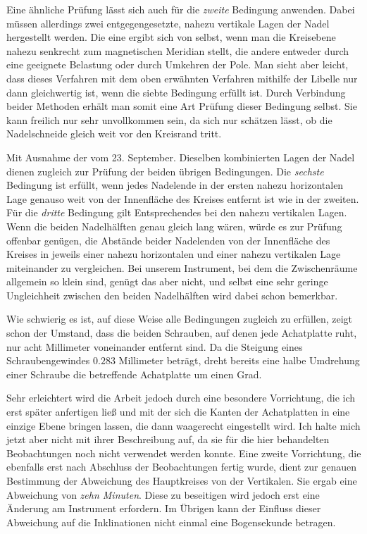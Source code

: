 Eine ähnliche Prüfung lässt sich auch für die \textit{zweite} Bedingung anwenden. Dabei müssen allerdings zwei entgegengesetzte, nahezu vertikale Lagen der Nadel hergestellt werden. Die eine ergibt sich von selbst, wenn man die Kreisebene nahezu senkrecht zum magnetischen Meridian stellt, die andere entweder durch eine geeignete Belastung oder durch Umkehren der Pole. Man sieht aber leicht, dass dieses Verfahren mit dem oben erwähnten Verfahren mithilfe der Libelle nur dann gleichwertig ist, wenn die siebte Bedingung erfüllt ist. Durch Verbindung beider Methoden erhält man somit eine Art Prüfung dieser Bedingung selbst. Sie kann freilich nur sehr unvollkommen sein, da sich nur schätzen lässt, ob die Nadelschneide gleich weit vor den Kreisrand tritt.

\expandafter\def\csname HistoricalNoteText454\endcsname{Mit Ausnahme der vom 23. September.}%
Dieselben kombinierten Lagen der Nadel dienen zugleich zur Prüfung der beiden übrigen Bedingungen. Die \textit{sechste} Bedingung ist erfüllt, wenn jedes Nadelende in der ersten nahezu horizontalen Lage genauso weit von der Innenfläche des Kreises entfernt ist wie in der zweiten. Für die \textit{dritte} Bedingung gilt Entsprechendes bei den nahezu vertikalen Lagen. Wenn die beiden Nadelhälften genau gleich lang wären, würde es zur Prüfung offenbar genügen, die Abstände beider Nadelenden von der Innenfläche des Kreises in jeweils einer nahezu horizontalen und einer nahezu vertikalen Lage miteinander zu vergleichen. Bei unserem Instrument, bei dem die Zwischenräume allgemein so klein sind, genügt das aber nicht, und selbst eine sehr geringe Ungleichheit zwischen den beiden Nadelhälften wird dabei schon bemerkbar.

Wie schwierig es ist, auf diese Weise alle Bedingungen zugleich zu erfüllen, zeigt schon der Umstand, dass die beiden Schrauben, auf denen jede Achatplatte ruht, nur acht Millimeter voneinander entfernt sind. Da die Steigung eines Schraubengewindes $0.283$ Millimeter beträgt, dreht bereits eine halbe Umdrehung einer Schraube die betreffende Achatplatte um einen Grad.

Sehr erleichtert wird die Arbeit jedoch durch eine besondere Vorrichtung, die ich erst später anfertigen ließ und mit der sich die Kanten der Achatplatten in eine einzige Ebene bringen lassen, die dann waagerecht eingestellt wird. Ich halte mich jetzt aber nicht mit ihrer Beschreibung auf, da sie für die hier behandelten Beobachtungen noch nicht verwendet werden konnte. Eine zweite Vorrichtung, die ebenfalls erst nach Abschluss der Beobachtungen fertig wurde, dient zur genauen Bestimmung der Abweichung des Hauptkreises von der Vertikalen. Sie ergab eine Abweichung von \textit{zehn Minuten}. Diese zu beseitigen wird jedoch erst eine Änderung am Instrument erfordern. Im Übrigen kann der Einfluss dieser Abweichung auf die Inklinationen nicht einmal eine Bogensekunde betragen.

